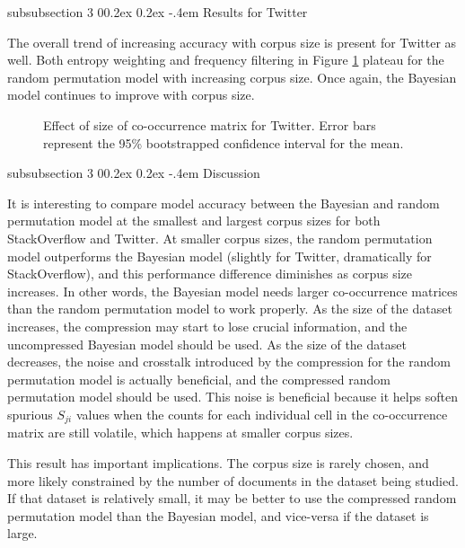 \documentclass[man,floatsintext,donotrepeattitle]{apa6}
\makeatletter
\renewcommand{\subsubsection}{%
  \@startsection
  {subsubsection}%
  {3}%
  {\parindent}%
  {0\baselineskip \@plus 0.2ex \@minus 0.2ex}%
  {-.4em}%
  {\normalfont\normalsize\bfseries\addperi}}
\makeatother
\begin{document}
\subsubsection{Results for Twitter}

The overall trend of increasing accuracy with corpus size is present for Twitter as well.
Both entropy weighting and frequency filtering in Figure \ref{figContextDocumentSizeT} plateau for the random permutation model with increasing corpus size.
Once again, the Bayesian model continues to improve with corpus size.

\begin{figure}[!htbp]
  \caption{
    Effect of size of co-occurrence matrix for Twitter.
    Error bars represent the 95\% bootstrapped confidence interval for the mean.
  }
  \label{figContextDocumentSizeT}
\end{figure}

\subsubsection{Discussion}

It is interesting to compare model accuracy between the Bayesian and random permutation model at the smallest and largest corpus sizes for both StackOverflow and Twitter.
At smaller corpus sizes, the random permutation model outperforms the Bayesian model (slightly for Twitter, dramatically for StackOverflow), and this performance difference diminishes as corpus size increases.
In other words, the Bayesian model needs larger co-occurrence matrices than the random permutation model to work properly.
As the size of the dataset increases, the compression may start to lose crucial information, and the uncompressed Bayesian model should be used.
As the size of the dataset decreases, the noise and crosstalk introduced by the compression for the random permutation model is actually beneficial, and the compressed random permutation model should be used. 
This noise is beneficial because it helps soften spurious $S_{ji}$ values when the counts for each individual cell in the co-occurrence matrix are still volatile, which happens at smaller corpus sizes.

This result has important implications.
The corpus size is rarely chosen, and more likely constrained by the number of documents in the dataset being studied.
If that dataset is relatively small, it may be better to use the compressed random permutation model than the Bayesian model, and vice-versa if the dataset is large.
\end{document}
